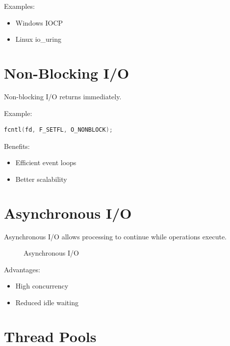 Examples:

\begin{itemize}
\item Windows IOCP
\item Linux io\_uring
\end{itemize}

\section{Non-Blocking I/O}

Non-blocking I/O returns immediately.

Example:

\begin{lstlisting}[style=interviewcode,language=C]
fcntl(fd, F_SETFL, O_NONBLOCK);
\end{lstlisting}

Benefits:

\begin{itemize}
\item Efficient event loops
\item Better scalability
\end{itemize}

\section{Asynchronous I/O}

Asynchronous I/O allows processing to continue while operations execute.

\begin{figure}[H]
\centering
{}
\caption{Asynchronous I/O}
\end{figure}

Advantages:

\begin{itemize}
\item High concurrency
\item Reduced idle waiting
\end{itemize}

\section{Thread Pools}

